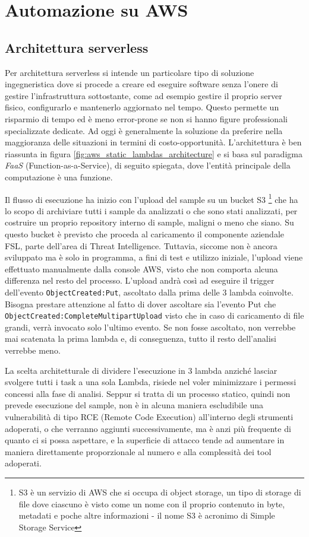 \section{Automazione su AWS}
\subsection{Architettura serverless}
Per architettura serverless si intende un particolare tipo di soluzione ingegneristica dove si procede a creare ed eseguire software senza l'onere di gestire l'infrastruttura sottostante, come ad esempio gestire il proprio server fisico, configurarlo e mantenerlo aggiornato nel tempo. Questo permette un risparmio di tempo ed è meno error-prone se non si hanno figure professionali specializzate dedicate. Ad oggi è generalmente la soluzione da preferire nella maggioranza delle situazioni in termini di costo-opportunità.
L'architettura è ben riassunta in figura \ref{fig:aws_static_lambdas_architecture} e si basa sul paradigma \emph{FaaS} (Function-as-a-Service), di seguito spiegata, dove l'entità principale della computazione è una funzione.

Il flusso di esecuzione ha inizio con l'upload del sample su un bucket S3
\footnote{S3 è un servizio di AWS che si occupa di object storage, un tipo di storage di file dove ciascuno è visto come un nome con il proprio contenuto in byte, metadati e poche altre informazioni - il nome S3 è acronimo di Simple Storage Service}
che ha lo scopo di archiviare tutti i sample da analizzati o che sono stati analizzati, per costruire un proprio repository interno di sample, maligni o meno che siano.
Su questo bucket è previsto che proceda al caricamento il componente aziendale FSL, parte dell'area di Threat Intelligence. Tuttavia, siccome non è ancora sviluppato ma è solo in programma, a fini di test e utilizzo iniziale, l'upload viene effettuato manualmente dalla console AWS, visto che non comporta alcuna differenza nel resto del processo.
L'upload andrà così ad eseguire il trigger dell'evento \texttt{ObjectCreated:Put}, ascoltato dalla prima delle 3 lambda coinvolte. Bisogna prestare attenzione al fatto di dover ascoltare sia l'evento Put che \texttt{ObjectCreated:CompleteMultipartUpload} visto che in caso di caricamento di file grandi, verrà invocato solo l'ultimo evento. Se non fosse ascoltato, non verrebbe mai scatenata la prima lambda e, di conseguenza, tutto il resto dell'analisi verrebbe meno.

La scelta architetturale di dividere l'esecuzione in 3 lambda anziché lasciar svolgere tutti i task a una sola Lambda, risiede nel voler minimizzare i permessi concessi alla fase di analisi. Seppur si tratta di un processo statico, quindi non prevede esecuzione del sample, non è in alcuna maniera escludibile una vulnerabilità di tipo RCE (Remote Code Execution) all'interno degli strumenti adoperati, o che verranno aggiunti successivamente,
ma è anzi più frequente di quanto ci si possa aspettare, e la superficie di attacco tende ad aumentare in maniera direttamente proporzionale al numero e alla complessità dei tool adoperati.

